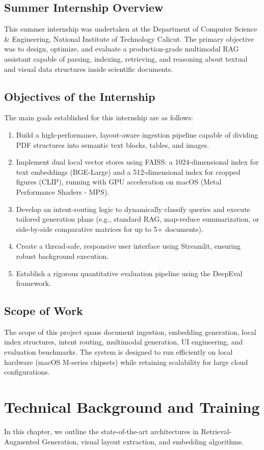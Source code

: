 \documentclass[12pt]{report}
\begin{document}
{\section{Summer Internship Overview}
This summer internship was undertaken at the Department of Computer Science \& Engineering, National Institute of Technology Calicut. The primary objective was to design, optimize, and evaluate a production-grade multimodal RAG assistant capable of parsing, indexing, retrieving, and reasoning about textual and visual data structures inside scientific documents.

\section{Objectives of the Internship}
The main goals established for this internship are as follows:
\begin{enumerate}
    \item Build a high-performance, layout-aware ingestion pipeline capable of dividing PDF structures into semantic text blocks, tables, and images.
    \item Implement dual local vector stores using FAISS: a 1024-dimensional index for text embeddings (BGE-Large) and a 512-dimensional index for cropped figures (CLIP), running with GPU acceleration on macOS (Metal Performance Shaders - MPS).
    \item Develop an intent-routing logic to dynamically classify queries and execute tailored generation plans (e.g., standard RAG, map-reduce summarization, or side-by-side comparative matrices for up to 5+ documents).
    \item Create a thread-safe, responsive user interface using Streamlit, ensuring robust background execution.
    \item Establish a rigorous quantitative evaluation pipeline using the DeepEval framework.
\end{enumerate}

\section{Scope of Work}
The scope of this project spans document ingestion, embedding generation, local index structures, intent routing, multimodal generation, UI engineering, and evaluation benchmarks. The system is designed to run efficiently on local hardware (macOS M-series chipsets) while retaining scalability for large cloud configurations.

\chapter{Technical Background and Training}
In this chapter, we outline the state-of-the-art architectures in Retrieval-Augmented Generation, visual layout extraction, and embedding algorithms.

}
\end{document}

